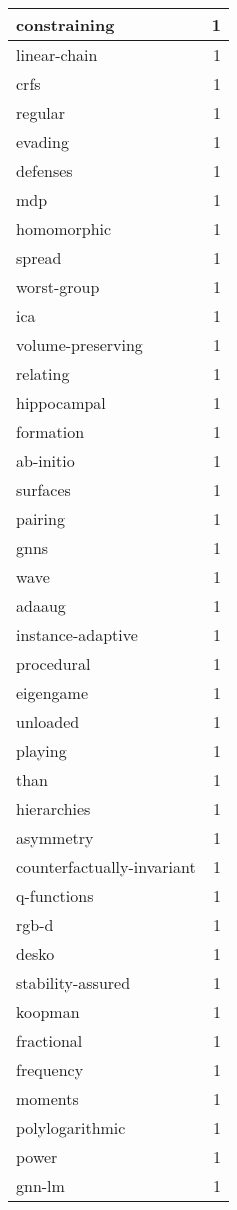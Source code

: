 \begin{table}[h]
\begin{tabular}{|l|r|}
\hline
constraining & 1 \\
\hline
linear-chain & 1 \\
\hline
crfs & 1 \\
\hline
regular & 1 \\
\hline
evading & 1 \\
\hline
defenses & 1 \\
\hline
mdp & 1 \\
\hline
homomorphic & 1 \\
\hline
spread & 1 \\
\hline
worst-group & 1 \\
\hline
ica & 1 \\
\hline
volume-preserving & 1 \\
\hline
relating & 1 \\
\hline
hippocampal & 1 \\
\hline
formation & 1 \\
\hline
ab-initio & 1 \\
\hline
surfaces & 1 \\
\hline
pairing & 1 \\
\hline
gnns & 1 \\
\hline
wave & 1 \\
\hline
adaaug & 1 \\
\hline
instance-adaptive & 1 \\
\hline
procedural & 1 \\
\hline
eigengame & 1 \\
\hline
unloaded & 1 \\
\hline
playing & 1 \\
\hline
than & 1 \\
\hline
hierarchies & 1 \\
\hline
asymmetry & 1 \\
\hline
counterfactually-invariant & 1 \\
\hline
q-functions & 1 \\
\hline
rgb-d & 1 \\
\hline
desko & 1 \\
\hline
stability-assured & 1 \\
\hline
koopman & 1 \\
\hline
fractional & 1 \\
\hline
frequency & 1 \\
\hline
moments & 1 \\
\hline
polylogarithmic & 1 \\
\hline
power & 1 \\
\hline
gnn-lm & 1 \\

\end{tabular}
\end{table}
